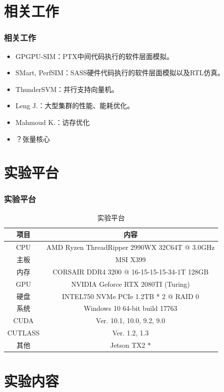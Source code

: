 \documentclass[10pt,aspectratio=169,mathserif]{beamer}
\begin{document}
	\section{相关工作}
	\begin{frame}
		\frametitle{相关工作}
		\begin{itemize}
			\item GPGPU-SIM：PTX中间代码执行的软件层面模拟。
			\item SMart, PerfSIM：SASS硬件代码执行的软件层面模拟以及RTL仿真。
			\item ThunderSVM：并行支持向量机。
			\item Leng J.：大型集群的性能、能耗优化。
			\item Mahmoud K.：访存优化
			\item ？张量核心
		\end{itemize}
	\end{frame}

	\section{实验平台}
	\begin{frame}
		\frametitle{实验平台}
		\begin{table}
			\centering
			\caption{实验平台}
			\begin{tabular}{cc}
				\toprule
				项目	&	内容\\
				\midrule
				CPU		&	AMD Ryzen ThreadRipper 2990WX 32C64T @ 3.0GHz\\
				主板		&	MSI X399\\
				内存		&	CORSAIR DDR4 3200 @ 16-15-15-15-34-1T 128GB\\
				GPU		&	NVIDIA Geforce RTX 2080TI (Turing)\\
				硬盘		&	INTEL750 NVMe PCIe 1.2TB * 2 @ RAID 0\\
				系统		&	Windows 10 64-bit build 17763\\	
				CUDA	&	Ver. 10.1, 10.0, 9.2, 9.0\\
				CUTLASS & Ver. 1.2, 1.3\\
				其他		&	Jetson TX2 $ * $\\
				\bottomrule
			\end{tabular}
		\end{table}
	\end{frame}
	
	\section{实验内容}
\end{document}

